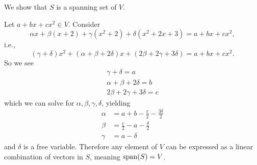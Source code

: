 \begin{questions}
    \item We show that $S$ is a spanning set of $V$.
    
    Let $a + bx + cx^2 \in V$. Consider
    \[
        \alpha x + \beta(x + 2) + \gamma(x^2 + 2) + \delta(x^2 + 2x + 3) = a + bx + cx^2,
    \]
    i.e.,
    \[
        (\gamma + \delta)x^2 + (\alpha + \beta + 2\delta)x + (2\beta + 2\gamma + 3\delta) = a + bx + cx^2.
    \]
    So we see
    \begin{align*}
        \gamma + \delta = a\\
        \alpha + \beta + 2\delta = b\\
        2\beta + 2\gamma + 3\delta = c
    \end{align*}
    which we can solve for $\alpha, \beta, \gamma, \delta$, yielding
    \begin{align*}
        \alpha &= a + b - \frac{c}{2} - \frac{3\delta}{2}\\
        \beta &= \frac{c}{2} - a - \frac{\delta}{2}\\
        \gamma &= a - \delta
    \end{align*}
    and $\delta$ is a free variable. Therefore any element of $V$ can be expressed as a linear combination of vectors in $S$, meaning $\mathrm{span}(S) = V$.
\end{questions}
